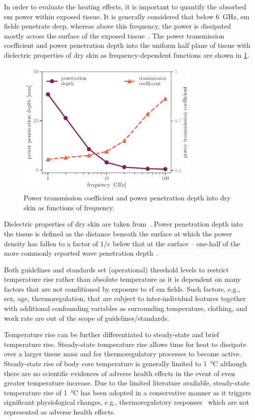 In order to evaluate the heating effects, it is important to quantify the absorbed \gls{em} power within exposed tissue.
It is generally considered that below \SI{6}{\GHz}, \gls{em} fields penetrate deep, whereas above this frequency, the power is dissipated mostly across the surface of the exposed tissue~\cite{Ziskin2018Tissue}.
The power transmission coefficient and power penetration depth into the uniform half plane of tissue with dielectric properties of dry skin as frequency-dependent functions are shown in \cref{fig:penetration_depth}.
\begin{figure}[ht]
    \centering
    \includegraphics[width=0.8\textwidth]{artwork/penetration_depth.pdf}
    \caption{Power transmission coefficient and power penetration depth into dry skin as functions of frequency.}
    \label{fig:penetration_depth}
\end{figure}
Dielectric properties of dry skin are taken from~\cite{Gabriel1996Compilation}.
Power penetration depth into the tissue is defined
as the distance beneath the surface at which the power density has fallen to a factor of $1/e$ below that at the surface -- one-half of the more commonly reported wave penetration depth~\cite{Foster2016Thermal}.

Both guidelines and standards set (operational) threshold levels to restrict temperature rise rather than absolute temperature as it is dependent on many factors that are not conditioned by exposure to \gls{rf} \gls{em} fields.
Such factors, e.g., sex, age, thermoregulation, that are subject to inter-individual features together with additional confounding variables as surrounding temperature, clothing, and work rate are out of the scope of guidelines/standards.

Temperature rise can be further differentiated to steady-state and brief temperature rise.
Steady-state temperature rise allows time for heat to dissipate over a larger tissue mass and for thermoregulatory processes to become active.
Steady-state rise of body core temperature is generally limited to \SI{1}{\celsius} although there are no scientific evidences of adverse health effects in the event of even greater temperature increase.
Due to the limited literature available, steady-state temperature rise of \SI{1}{\celsius} has been adopted in a conservative manner as it triggers significant physiological changes, e.g., thermoregulatory responses~\cite{Heuvel2017independent} which are not represented as adverse health effects.


